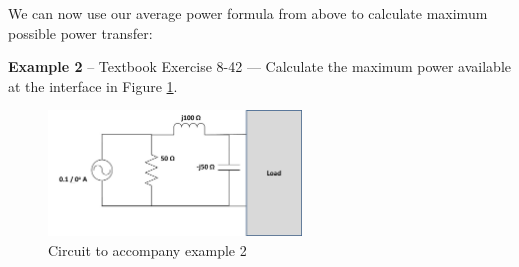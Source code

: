\documentclass{handout}
\begin{document}
We can now use our average power formula from above to calculate maximum possible power transfer:
\soln{2in}{
\[
P_{AVE} = \frac{R_L}{2}\frac{|\mathbf{V_T}|^2}{(R_T+R_T)^2+(X_T-X_T)^2} = \frac{|\mathbf{V_T}|^2}{8R_T}
\]
}

\textbf{Example 2} -- Textbook Exercise 8-42 --- Calculate the maximum power available at the interface in Figure \ref{fig: Example2}.
\begin{figure} [h!]
\centering
\includegraphics[width=0.6\textwidth]{Example2.jpg}
\caption{Circuit to accompany example 2}
\label{fig: Example2}
\end{figure}


\newpage
\clearpage
\pagebreak

\newpage
\clearpage
\pagebreak

\newpage
\clearpage
\pagebreak

\newpage
\clearpage
\pagebreak
\end{document}
